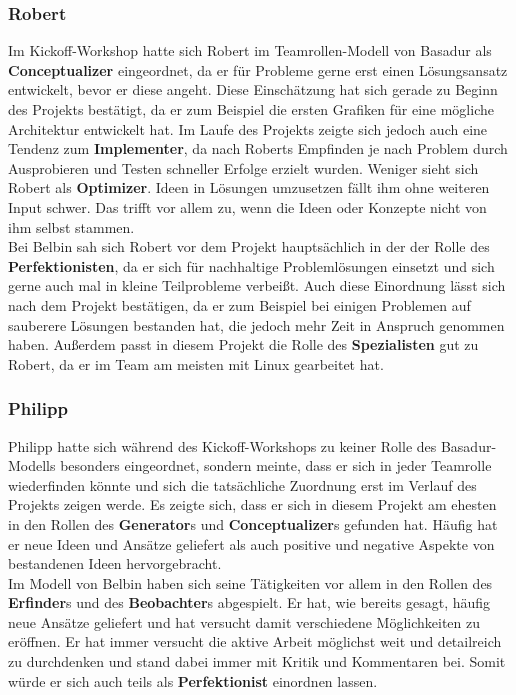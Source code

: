 \documentclass[a4paper,12pt,headsepline]{scrartcl}
\begin{document}
\subsubsection{Robert}
Im Kickoff-Workshop hatte sich Robert im Teamrollen-Modell von Basadur als \textbf{Conceptualizer} eingeordnet, da er für Probleme gerne erst einen Lösungsansatz entwickelt, bevor er diese angeht. Diese Einschätzung hat sich gerade zu Beginn des Projekts bestätigt, da er zum Beispiel die ersten Grafiken für eine mögliche Architektur entwickelt hat. Im Laufe des Projekts zeigte sich jedoch auch eine Tendenz zum \textbf{Implementer}, da nach Roberts Empfinden je nach Problem durch Ausprobieren und Testen schneller Erfolge erzielt wurden. Weniger sieht sich Robert als \textbf{Optimizer}. Ideen in Lösungen umzusetzen fällt ihm ohne weiteren Input schwer. Das trifft vor allem zu, wenn die Ideen oder Konzepte nicht von ihm selbst stammen.\\
Bei Belbin sah sich Robert vor dem Projekt hauptsächlich in der der Rolle des \textbf{Perfektionisten}, da er sich für nachhaltige Problemlösungen einsetzt und sich gerne auch mal in kleine Teilprobleme verbeißt. Auch diese Einordnung lässt sich nach dem Projekt bestätigen, da er zum Beispiel bei einigen Problemen auf sauberere Lösungen bestanden hat, die jedoch mehr Zeit in Anspruch genommen haben. Außerdem passt in diesem Projekt die Rolle des \textbf{Spezialisten} gut zu Robert, da er im Team am meisten mit Linux gearbeitet hat.  
\subsubsection{Philipp}
Philipp hatte sich während des Kickoff-Workshops zu keiner Rolle des Basadur-Modells besonders eingeordnet, sondern meinte, dass er sich in jeder Teamrolle wiederfinden könnte und sich die tatsächliche Zuordnung erst im Verlauf des Projekts zeigen werde. Es zeigte sich, dass er sich in diesem Projekt am ehesten in den Rollen des \textbf{Generator}s und \textbf{Conceptualizer}s gefunden hat. Häufig hat er neue Ideen und Ansätze geliefert als auch positive und negative Aspekte von bestandenen Ideen hervorgebracht. \\
Im Modell von Belbin haben sich seine Tätigkeiten vor allem in den Rollen des \textbf{Erfinder}s und des \textbf{Beobachter}s abgespielt. Er hat, wie bereits gesagt, häufig neue Ansätze geliefert und hat versucht damit verschiedene Möglichkeiten zu eröffnen. Er hat immer versucht die aktive Arbeit möglichst weit und detailreich zu durchdenken und stand dabei immer mit Kritik und Kommentaren bei. Somit würde er sich auch teils als \textbf{Perfektionist} einordnen lassen.
\end{document}
